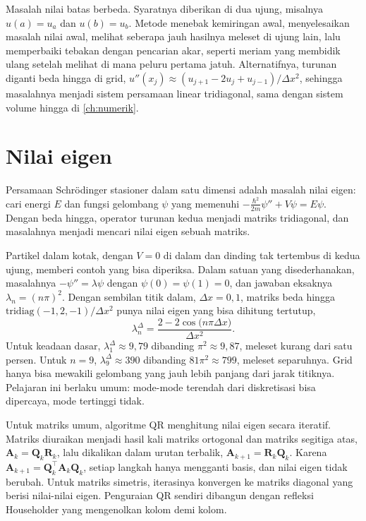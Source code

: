 Masalah nilai batas berbeda. Syaratnya diberikan di dua ujung, misalnya $u(a)=u_a$ dan $u(b)=u_b$. Metode
 menebak kemiringan awal, menyelesaikan masalah nilai awal, melihat seberapa jauh hasilnya meleset
di ujung lain, lalu memperbaiki tebakan dengan pencarian akar, seperti meriam yang membidik ulang setelah melihat
di mana peluru pertama jatuh. Alternatifnya, turunan diganti beda hingga di grid,
$u''(x_j)\approx(u_{j+1}-2u_j+u_{j-1})/\Delta x^2$, sehingga masalahnya menjadi sistem persamaan linear tridiagonal,
sama dengan sistem volume hingga di \cref{ch:numerik}.

\section{Nilai eigen}

Persamaan Schrödinger stasioner dalam satu dimensi adalah masalah nilai eigen: cari energi $E$ dan fungsi
gelombang $\psi$ yang memenuhi $-\tfrac{\hbar^2}{2m}\psi''+V\psi=E\psi$. Dengan beda hingga, operator turunan kedua
menjadi matriks tridiagonal, dan masalahnya menjadi mencari nilai eigen sebuah matriks.

Partikel dalam kotak, dengan $V=0$ di dalam dan dinding tak tertembus di kedua ujung, memberi contoh yang bisa
diperiksa. Dalam satuan yang disederhanakan, masalahnya $-\psi''=\lambda\psi$ dengan $\psi(0)=\psi(1)=0$, dan
jawaban eksaknya $\lambda_n=(n\pi)^2$. Dengan sembilan titik dalam, $\Delta x=0{,}1$, matriks beda hingga
$\mathrm{tridiag}(-1,2,-1)/\Delta x^2$ punya nilai eigen yang bisa dihitung tertutup,
\begin{equation}
\lambda_n^{\Delta}=\frac{2-2\cos\big(n\pi\Delta x\big)}{\Delta x^2}.
\end{equation}
Untuk keadaan dasar, $\lambda_1^\Delta\approx9{,}79$ dibanding $\pi^2\approx9{,}87$, meleset kurang dari satu
persen. Untuk $n=9$, $\lambda_9^\Delta\approx390$ dibanding $81\pi^2\approx799$, meleset separuhnya. Grid hanya
bisa mewakili gelombang yang jauh lebih panjang dari jarak titiknya. Pelajaran ini berlaku umum: mode-mode
terendah dari diskretisasi bisa dipercaya, mode tertinggi tidak.

Untuk matriks umum, algoritme QR menghitung nilai eigen secara iteratif. Matriks diuraikan menjadi hasil kali
matriks ortogonal dan matriks segitiga atas, $\bm A_k=\bm Q_k\bm R_k$, lalu dikalikan dalam urutan terbalik,
$\bm A_{k+1}=\bm R_k\bm Q_k$. Karena $\bm A_{k+1}=\bm Q_k^\top\bm A_k\bm Q_k$, setiap langkah hanya mengganti basis, dan
nilai eigen tidak berubah. Untuk matriks simetris, iterasinya konvergen ke matriks diagonal yang berisi nilai-nilai
eigen. Penguraian QR sendiri dibangun dengan refleksi Householder yang mengenolkan kolom demi kolom.

